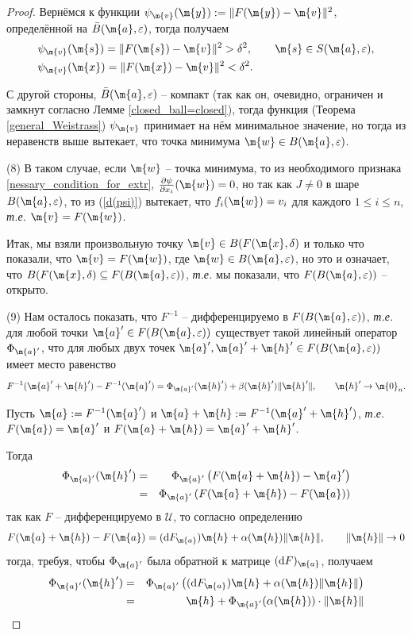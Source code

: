 \begin{proof}
Вернёмся к функции $\psi_\m{v}(\m{y}): = \| F(\m{y}) - \m{v}\|^2$, определённой на $\bar B(\m{a}, \varepsilon)$, тогда получаем 
\begin{align*}
    & \psi_\m{v}(\m{s}) = \| F(\m{s}) - \m{v}\|^2 > \delta^2, \qquad \m{s} \in S(\m{a},\varepsilon),\\
    &\psi_\m{v}(\m{x}) = \| F(\m{x}) - \m{v}\|^2 <\delta^2.
\end{align*}

С другой стороны, $\bar B(\m{a}, \varepsilon)$ -- компакт (так как он, очевидно, ограничен и замкнут согласно Лемме \ref{closed_ball=closed}), тогда функция (Теорема \ref{general_Weistrass}) $\psi_\m{v}$ принимает на нём минимальное значение, но тогда из неравенств выше вытекает, что точка минимума $\m{w} \in B(\m{a},\varepsilon)$.

(8) В таком случае, если $\m{w}$ -- точка минимума, то из необходимого признака \ref{nessary_condition_for_extr}, $\frac{\partial \psi}{\partial x_i}(\m{w})=0$, но так как $J \ne 0$ в шаре $B(\m{a},\varepsilon)$, то из (\ref{d(psi)}) вытекает, что $f_i(\m{w}) = v_i$ для каждого $1\le i \le n$, \textit{т.е.} $\m{v} = F(\m{w})$.

Итак, мы взяли произвольную точку $\m{v} \in B(F(\m{x}, \delta)$ и только что показали, что $\m{v} = F(\m{w})$, где $\m{w} \in B(\m{a},\varepsilon)$, но это и означает, что $B(F(\m{x}, \delta) \subseteq F(B(\m{a}, \varepsilon))$, \textit{т.е.} мы показали, что $F(B(\m{a}, \varepsilon))$ -- открыто.


(9) Нам осталось показать, что $F^{-1}$ -- дифференцируемо в $F(B(\m{a},\varepsilon))$, \textit{т.е.} для любой точки $\m{a}' \in F(B(\m{a},\varepsilon))$ существует такой линейный оператор $\Phi_{\m{a}'}$, что для любых двух точек $\m{a}', \m{a}' + \m{h}' \in F(B(\m{a},\varepsilon))$ имеет место равенство
\[
 F^{-1}(\m{a}' + \m{h}') - F^{-1}(\m{a}') = \Phi_{\m{a}'}(\m{h}') + \beta(\m{h}') \| \m{h}'\|, \qquad \m{h}' \to \m{0}_n.
\]

Пусть $\m{a}: = F^{-1}(\m{a}')$ и $\m{a} + \m{h} := F^{-1}(\m{a}' + \m{h}')$, \textit{т.е.} $F(\m{a}) = \m{a}'$ и $F(\m{a} + \m{h}) = \m{a}' + \m{h}'$. 

Тогда
\begin{eqnarray*}
    \Phi_{\m{a}'}(\m{h}') &=& \Phi_{\m{a}'}\left( F(\m{a} + \m{h}) - \m{a}'  \right) \\
    &=& \Phi_{\m{a}'}\left( F(\m{a} + \m{h}) - F(\m{a}) \right)
\end{eqnarray*}
так как $F$ -- дифференцируемо в $\mathscr{U}$, то согласно определению 
\[
 F(\m{a} + \m{h}) - F(\m{a}) = (\mathrm{d}F_\m{a})\m{h} + \alpha(\m{h})\| \m{h}\|, \qquad \|\m{h}\| \to 0
\]
тогда, требуя, чтобы $\Phi_{\m{a}'}$ была обратной к матрице $(\mathrm{d}F)_\m{a}$, получаем
\begin{eqnarray*}
    \Phi_{\m{a}'}(\m{h}')&=& \Phi_{\m{a}'}\left( (\mathrm{d}F_\m{a})\m{h} + \alpha(\m{h})\| \m{h}\| \right) \\
    &=& \m{h} + \Phi_{\m{a}'}(\alpha(\m{h}))\cdot \| \m{h}\|
\end{eqnarray*}


\end{proof}
